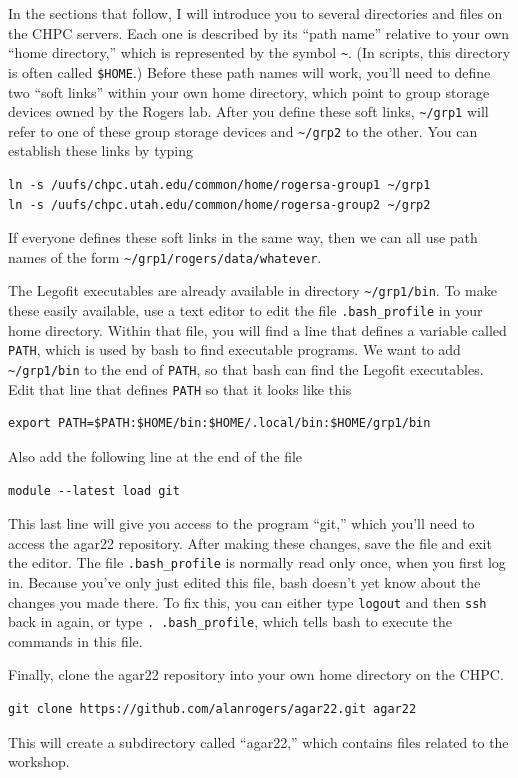 \documentclass[11pt]{article}
\begin{document}
In the sections that follow, I will introduce you to several
directories and files on the CHPC servers. Each one is described by
its ``path name'' relative to your own ``home directory,'' which is
represented by the symbol \verb|~|. (In scripts, this directory is
often called \verb|$HOME|.) Before these path names will work, you'll
need to define two ``soft links'' within your own home directory,
which point to group storage devices owned by the Rogers lab. After
you define these soft links, \verb|~/grp1| will refer to one of these
group storage devices and \verb|~/grp2| to the other. You can
establish these links by typing
\begin{verbatim}
ln -s /uufs/chpc.utah.edu/common/home/rogersa-group1 ~/grp1
ln -s /uufs/chpc.utah.edu/common/home/rogersa-group2 ~/grp2
\end{verbatim}
If everyone defines these soft links in the same way, then we can all
use path names of the form \verb|~/grp1/rogers/data/whatever|.

The Legofit executables are already available in directory
\verb|~/grp1/bin|. To make these easily available, use a text editor
to edit the file \verb|.bash_profile| in your home directory. Within
that file, you will find a line that defines a variable called
\texttt{PATH}, which is used by bash to find executable programs. We
want to add \verb|~/grp1/bin| to the end of \texttt{PATH}, so that
bash can find the Legofit executables. Edit that line that defines
\texttt{PATH} so that it looks like this
\begin{verbatim}
export PATH=$PATH:$HOME/bin:$HOME/.local/bin:$HOME/grp1/bin
\end{verbatim}
Also add the following line at the end of the file
\begin{verbatim}
module --latest load git
\end{verbatim}
This last line will give you access to the program ``git,'' which
you'll need to access the agar22 repository. After making these
changes, save the file and exit the editor. The file
\verb|.bash_profile| is normally read only once, when you first log
in. Because you've only just edited this file, bash doesn't yet know
about the changes you made there. To fix this, you can either type
\texttt{logout} and then \texttt{ssh} back in again, or type
\verb|. .bash_profile|, which tells bash to execute the commands in
this file.

Finally, clone the agar22 repository into your own home directory on
the CHPC.
\begin{verbatim}
git clone https://github.com/alanrogers/agar22.git agar22
\end{verbatim}
This will create a subdirectory called ``agar22,'' which contains
files related to the workshop.
\end{document}
